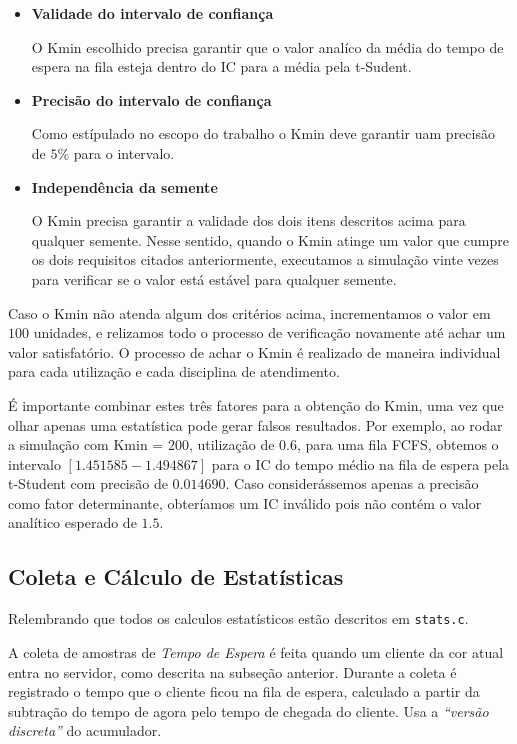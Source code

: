 \documentclass[a4paper]{article}
\newcommand{\arq}{\texttt}
\begin{document}
\begin{itemize}
    \item \textbf{Validade do intervalo de confiança} \par
        O Kmin escolhido precisa garantir que o valor
        analíco da média do tempo de espera na fila esteja dentro do
        IC para a média pela t-Sudent.

    \item \textbf{Precisão do intervalo de confiança} \par
        Como estípulado no escopo do trabalho o Kmin deve garantir
        uam precisão de \(5\%\) para o intervalo.
    
    \item \textbf{Independência da semente} \par
        O Kmin precisa garantir a validade dos dois itens 
        descritos acima para qualquer semente. Nesse sentido,
        quando o Kmin atinge um valor que cumpre os dois
        requisitos citados anteriormente, executamos a simulação 
        vinte vezes para verificar se o valor está estável para
        qualquer semente.

\end{itemize}
Caso o Kmin não atenda algum dos critérios acima, incrementamos o 
valor em \(100\) unidades, e relizamos todo o processo de verificação
novamente até achar um valor satisfatório. O processo de achar o Kmin
é realizado de maneira individual para cada utilização e cada disciplina
de atendimento.

É importante combinar estes três fatores para a obtenção do Kmin, uma vez que
olhar apenas uma estatística pode gerar falsos resultados. Por exemplo, ao rodar
a simulação com Kmin = \(200\), utilização de \(0.6\), para uma fila FCFS,
obtemos o intervalo \([1.451585 - 1.494867]\) para o IC do tempo médio
na fila de espera pela t-Student com precisão de \(0.014690\). Caso considerássemos
apenas a precisão como fator determinante, obteríamos um IC inválido
pois não contém o valor analítico esperado de \(1.5\).

\subsection{Coleta e Cálculo de Estatísticas}
Relembrando que todos os calculos estatísticos estão
descritos em \arq{stats.c}.

A coleta de amostras de \emph{Tempo de Espera} é feita
quando um cliente da cor atual entra no servidor,
como descrita na subseção anterior.
Durante a coleta é registrado o tempo
que o cliente ficou na fila de espera,
calculado a partir da subtração do tempo de agora
pelo tempo de chegada do cliente.
Usa a \emph{``versão discreta''} do acumulador.
\end{document}
